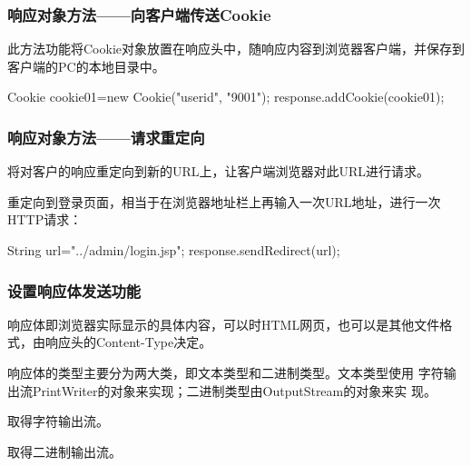 \begin{frame}[fragile] %
\frametitle{响应对象方法——向客户端传送Cookie} 


此方法功能将Cookie对象放置在响应头中，随响应内容到浏览器客户端，并保存到客户端的PC的本地目录中。

\begin{javaCode}
Cookie cookie01=new Cookie("userid", "9001");
response.addCookie(cookie01);
\end{javaCode}

\end{frame}

\begin{frame}[fragile] %
\frametitle{响应对象方法——请求重定向} 


将对客户的响应重定向到新的URL上，让客户端浏览器对此URL进行请求。

{\kai 重定向到登录页面，相当于在浏览器地址栏上再输入一次URL地址，进行一次HTTP请求：}

\begin{javaCode}
 String url="../admin/login.jsp";
 response.sendRedirect(url);
 \end{javaCode}
\end{frame}

\begin{frame}[fragile] %
\frametitle{设置响应体发送功能}

响应体即浏览器实际显示的具体内容，可以时HTML网页，也可以是其他文件格式，由响应头的Content-Type决定。

响应体的类型主要分为两大类，即文本类型和二进制类型。{\Red 文本类型使用
  字符输出流PrintWriter的对象来实现；二进制类型由OutputStream的对象来实
  现。}


取得字符输出流。


取得二进制输出流。

\end{frame}


